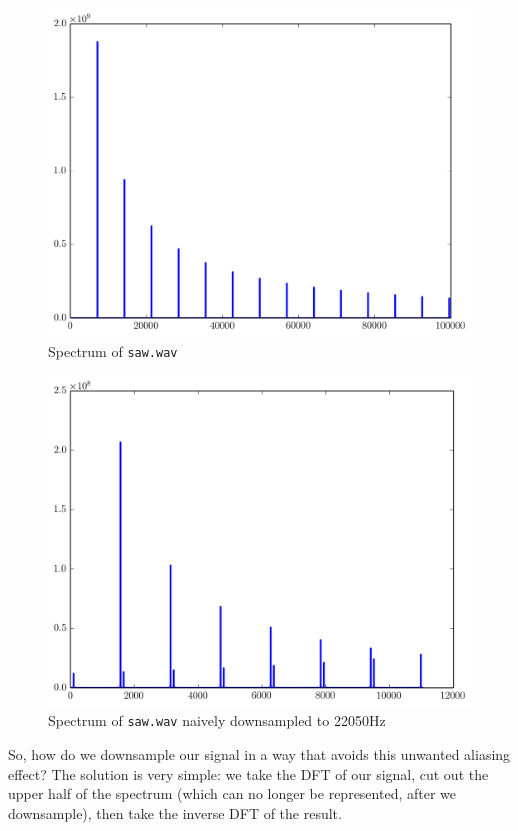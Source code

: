 \begin{figure}[ht]\caption{Spectrum of \texttt{saw.wav}}\label{sawspec}\centering\includegraphics[width=\textwidth]{sawspec}\end{figure}

\begin{figure}[ht]\caption{Spectrum of \texttt{saw.wav} naively downsampled to 22050Hz}\label{sawspecdown}\centering\includegraphics[width=\textwidth]{sawspecdown}\end{figure}

So, how do we downsample our signal in a way that avoids this unwanted aliasing effect? The solution is very simple: we take the DFT of our signal, cut out the upper half of the spectrum (which can no longer be represented, after we downsample), then take the inverse DFT of the result.

